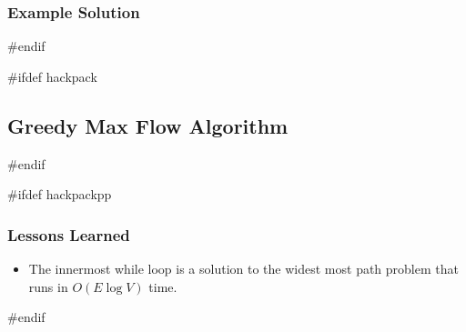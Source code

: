 \subsubsection{Example Solution}
#endif

#ifdef hackpack
\subsection{Greedy Max Flow Algorithm}
#endif

#ifdef hackpackpp
\subsubsection{Lessons Learned}
\begin{itemize}
	\item The innermost while loop is a solution to the widest most path problem that runs in $O(E \log V)$ time.
\end{itemize}
#endif

